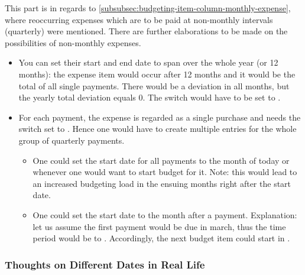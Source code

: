 This part is in regards to \autoref{subsubsec:budgeting-item-column-monthly-expense}, where reoccurring expenses which are to be paid at non-monthly intervals (\eg quarterly) were mentioned.
There are further elaborations to be made on the possibilities of non-monthly expenses.
\begin{itemize}
	\item You can set their start and end date to span over the whole year (or 12 months): the expense item would occur after 12 months and it would be the total of all single payments.
	There would be a deviation in all months, but the yearly total deviation equals 0.
	The  switch would have to be set to .
	\item For each payment, \ie the expense is regarded as a single purchase and needs the  switch set to .
	Hence one would have to create multiple entries for the whole group of quarterly payments.
	\begin{itemize}
		\item One could set the start date for all payments to the month of today or whenever one would want to start budget for it.
		Note: this would lead to an increased budgeting load in the ensuing months right after the start date.
		\item One could set the start date to the month after a payment.
		Explanation: let us assume the first payment would be due in march, thus the time period would be  to .
		Accordingly, the next budget item could start in .
	\end{itemize}
\end{itemize}

\subsubsection{Thoughts on Different Dates in Real Life}
\label{subsubsec:thoughts-different-dates}

